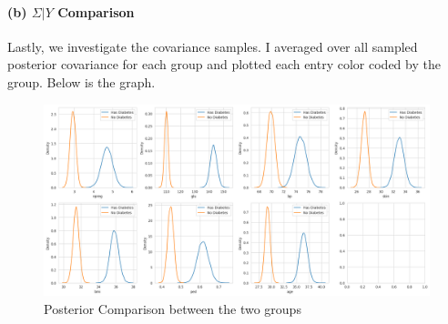 \documentclass[11pt, letterpaper]{article}
\begin{document}
\paragraph{(b) $\Sigma|Y$ Comparison}
Lastly, we investigate the covariance samples. I averaged over all sampled posterior covariance for each group and plotted each entry color coded by the group. Below is the graph.
\begin{figure}[!h]
  \centering
  \includegraphics[width=1.0\textwidth]{3.a.png}
  \captionsetup{justification=centering}
  \caption{Posterior Comparison between the two groups}
\end{figure}
\end{document}
